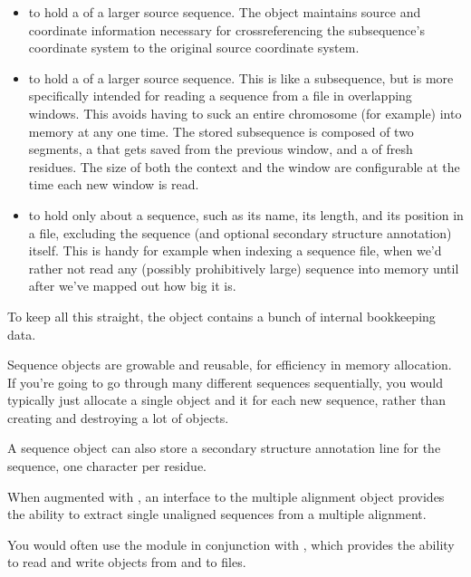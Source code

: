 \begin{itemize}
\item to hold a  of a larger source sequence. The
  object maintains source and coordinate information necessary for
  crossreferencing the subsequence's coordinate system to the original
  source coordinate system.

\item to hold a  of a larger source sequence. This is
  like a subsequence, but is more specifically intended for reading a
  sequence from a file in overlapping windows. This avoids having to
  suck an entire chromosome (for example) into memory at any one
  time. The stored subsequence is composed of two segments, a
   that gets saved from the previous window,
  and a  of fresh residues. The size of both the
  context and the window are configurable at the time each new window
  is read.

\item to hold only  about a sequence, such as its
  name, its length, and its position in a file, excluding the sequence
  (and optional secondary structure annotation) itself. This is handy
  for example when indexing a sequence file, when we'd rather not read
  any (possibly prohibitively large) sequence into memory until after
  we've mapped out how big it is.
\end{itemize}

To keep all this straight, the object contains a bunch of internal
bookkeeping data.

Sequence objects are growable and reusable, for efficiency in memory
allocation. If you're going to go through many different sequences
sequentially, you would typically just allocate a single
 object and  it for each new
sequence, rather than creating and destroying a lot of objects.

A sequence object can also store a secondary structure annotation line
for the sequence, one character per residue.

When augmented with , an interface to the 
multiple alignment object provides the ability to extract single
unaligned sequences from a multiple alignment.

You would often use the  module in conjunction with
, which provides the ability to read and write
 objects from and to files.

